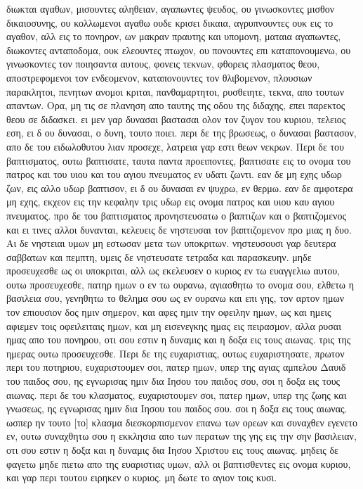 διωκται αγαθων, μισουντες αληθειαν, αγαπωντες ψευδος, ου γινωσκοντες μισθον δικαιοσυνης, ου κολλωμενοι αγαθω ουδε κρισει δικαια, αγρυπνουντες ουκ εις το αγαθον, αλλ εις το πονηρον, ων μακραν πραυτης και υπομονη, ματαια αγαπωντες, διωκοντες ανταποδομα, ουκ ελεουντες πτωχον, ου πονουντες επι καταπονουμενω, ου γινωσκοντες τον ποιησαντα αυτους, φονεις τεκνων, φθορεις πλασματος θεου, αποστρεφομενοι τον ενδεομενον, καταπονουντες τον θλιβομενον, πλουσιων παρακλητοι, πενητων ανομοι κριται, πανθαμαρτητοι, ρυσθειητε, τεκνα, απο τουτων απαντων.
Ορα, μη τις σε πλανηση απο ταυτης της οδου της διδαχης, επει παρεκτος θεου σε διδασκει.
ει μεν γαρ δυνασαι βαστασαι ολον τον ζυγον του κυριου, τελειος εση, ει δ ου δυνασαι, ο δυνη, τουτο ποιει.
περι δε της βρωσεως, ο δυνασαι βαστασον, απο δε του ειδωλοθυτου λιαν προσεχε, λατρεια γαρ εστι θεων νεκρων.
Περι δε του βαπτισματος, ουτω βαπτισατε, ταυτα παντα προειποντες, βαπτισατε εις το ονομα του πατρος και του υιου και του αγιου πνευματος εν υδατι ζωντι.
εαν δε μη εχης υδωρ ζων, εις αλλο υδωρ βαπτισον, ει δ ου δυνασαι εν ψυχρω, εν θερμω.
εαν δε αμφοτερα μη εχης, εκχεον εις την κεφαλην τρις υδωρ εις ονομα πατρος και υιου καυ αγιου πνευματος.
προ δε του βαπτισματος προνηστευσατω ο βαπτιζων και ο βαπτιζομενος και ει τινες αλλοι δυνανται, κελευεις δε νηστευσαι τον βαπτιζομενον προ μιας η δυο.
Αι δε νηστειαι υμων μη εστωσαν μετα των υποκριτων. νηστευσουσι γαρ δευτερα σαββατων και πεμπτη, υμεις δε νηστευσατε τετραδα και παρασκευην.
μηδε προσευχεσθε ως οι υποκριται, αλλ ως εκελευσεν ο κυριος εν τω ευαγγελιω αυτου, ουτω προσευχεσθε, πατηρ ημων ο εν τω ουρανω, αγιασθητω το ονομα σου, ελθετω η βασιλεια σου, γενηθητω το θελημα σου ως εν ουρανω και επι γης, τον αρτον ημων τον επιουσιον δος ημιν σημερον, και αφες ημιν την οφειλην ημων, ως και ημεις αφιεμεν τοις οφειλειταις ημων, και μη εισενεγκης ημας εις πειρασμον, αλλα ρυσαι ημας απο του πονηρου, οτι σου εστιν η δυναμις και η δοξα εις τους αιωνας.
τρις της ημερας ουτω προσευχεσθε.
Περι δε της ευχαριστιας, ουτως ευχαριστησατε,
πρωτον περι του ποτηριου, ευχαριστουμεν σοι, πατερ ημων, υπερ της αγιας αμπελου Δαυιδ του παιδος σου, ης εγνωρισας ημιν δια Ιησου του παιδος σου, σοι η δοξα εις τους αιωνας.
περι δε του κλασματος, ευχαριστουμεν σοι, πατερ ημων, υπερ της ζωης και γνωσεως, ης εγνωρισας ημιν δια Ιησου του παιδος σου. σοι η δοξα εις τους αιωνας.
ωσπερ ην τουτο [το] κλασμα διεσκορπισμενον επανω των ορεων και συναχθεν εγενετο εν, ουτω συναχθητω σου η εκκλησια απο των περατων της γης εις την σην βασιλειαν, οτι σου εστιν η δοξα και η δυναμις δια Ιησου Χριστου εις τους αιωνας.
μηδεις δε φαγετω μηδε πιετω απο της ευαριστιας υμων, αλλ οι βαπτισθεντες εις ονομα κυριου, και γαρ περι τουτου ειρηκεν ο κυριος. μη δωτε το αγιον τοις κυσι.
